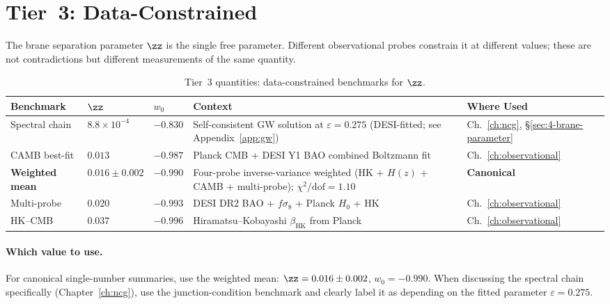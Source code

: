 \section{Tier~3: Data-Constrained}
\label{app:val-tier3}

The brane separation parameter $\zz$ is the single free parameter. Different observational probes constrain it at different values; these are not contradictions but different measurements of the same quantity.

\begin{table}[h!]
\caption{Tier~3 quantities: data-constrained benchmarks for $\zz$.}
\label{tab:val-tier3}
\small
\renewcommand{\arraystretch}{1.25}
\begin{tabular}{@{}p{3.5cm}p{2.2cm}p{1.8cm}p{4.5cm}p{2.5cm}@{}}
\toprule
\textbf{Benchmark} & \textbf{$\zz$} & \textbf{$w_0$} & \textbf{Context} & \textbf{Where Used} \\
\midrule

Spectral chain &
$8.8 \times 10^{-4}$ &
$-0.830$ &
Self-consistent GW solution at $\varepsilon = 0.275$ (DESI-fitted; see Appendix~\ref{app:gw}) &
Ch.~\ref{ch:ncg}, \S\ref{sec:4-brane-parameter} \\

CAMB best-fit &
$0.013$ &
$-0.987$ &
Planck CMB + DESI Y1 BAO combined Boltzmann fit &
Ch.~\ref{ch:observational} \\

\textbf{Weighted mean} &
$\mathbf{0.016 \pm 0.002}$ &
$\mathbf{-0.990}$ &
Four-probe inverse-variance weighted (HK + $H(z)$ + CAMB + multi-probe); $\chi^2/\mathrm{dof} = 1.10$ &
\textbf{Canonical} \\

Multi-probe &
$0.020$ &
$-0.993$ &
DESI DR2 BAO + $f\sigma_8$ + Planck $H_0$ + HK &
Ch.~\ref{ch:observational} \\

HK--CMB &
$0.037$ &
$-0.996$ &
Hiramatsu--Kobayashi $\beta_\mathrm{HK}$ from Planck &
Ch.~\ref{ch:observational} \\

\bottomrule
\end{tabular}
\end{table}

\paragraph{Which value to use.}
For canonical single-number summaries, use the weighted mean: $\zz = 0.016 \pm 0.002$, $w_0 = -0.990$. When discussing the spectral chain specifically (Chapter~\ref{ch:ncg}), use the junction-condition benchmark and clearly label it as depending on the fitted parameter $\varepsilon = 0.275$.

